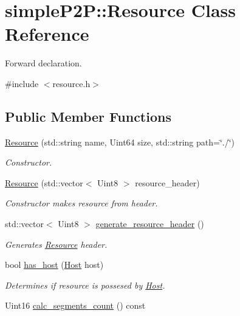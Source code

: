 \hypertarget{classsimpleP2P_1_1Resource}{}\section{simple\+P2P\+:\+:Resource Class Reference}
\label{classsimpleP2P_1_1Resource}


Forward declaration.  




{\ttfamily \#include $<$resource.\+h$>$}

\subsection*{Public Member Functions}
\begin{DoxyCompactItemize}
\item 
\hyperlink{classsimpleP2P_1_1Resource_a0aed54e6cf7d3a5fa2c53fe3b3b57d19}{Resource} (std\+::string name, Uint64 size, std\+::string path=\char`\"{}./\char`\"{})
\begin{DoxyCompactList}\small\item\em Constructor. \end{DoxyCompactList}\item 
\hyperlink{classsimpleP2P_1_1Resource_aa725d8f5028c2f83a088a18bcbd9318d}{Resource} (std\+::vector$<$ Uint8 $>$ resource\+\_\+header)
\begin{DoxyCompactList}\small\item\em Constructor makes resource from header. \end{DoxyCompactList}\item 
std\+::vector$<$ Uint8 $>$ \hyperlink{classsimpleP2P_1_1Resource_a87e735b9e7b48c329698c6e7aab455a8}{generate\+\_\+resource\+\_\+header} ()
\begin{DoxyCompactList}\small\item\em Generates \hyperlink{classsimpleP2P_1_1Resource}{Resource} header. \end{DoxyCompactList}\item 
bool \hyperlink{classsimpleP2P_1_1Resource_ac3c067c66ef0db0a25a7904a83f50e3d}{has\+\_\+host} (\hyperlink{classsimpleP2P_1_1Host}{Host} host)
\begin{DoxyCompactList}\small\item\em Determines if resource is possesed by \hyperlink{classsimpleP2P_1_1Host}{Host}. \end{DoxyCompactList}\item 
Uint16 \hyperlink{classsimpleP2P_1_1Resource_a4bbfde4d1e25c62ae4da0e6dfd64900b}{calc\+\_\+segments\+\_\+count} () const

\end{DoxyCompactItemize}
